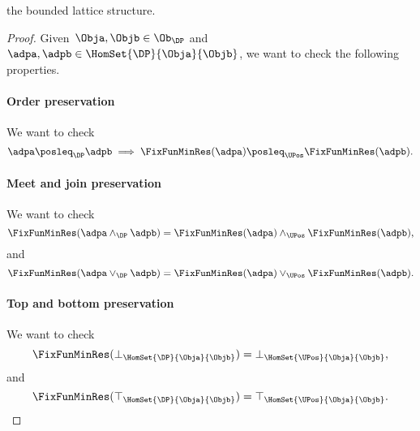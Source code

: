 
\begin{lemma}
    \FixFunMinRes the bounded lattice structure.
\end{lemma}
\begin{proof}
    Given~$\Obja,\Objb \in \Ob_\DP$ and~$\adpa,\adpb \in \HomSet{\DP}{\Obja}{\Objb}$, we want to check the following properties.
    \paragraph*{Order preservation}
    We want to check
    \begin{equation*}
        \adpa \posleq_\DP \adpb \implies \FixFunMinRes(\adpa) \posleq_\UPos \FixFunMinRes(\adpb).
    \end{equation*}
    \paragraph*{Meet and join preservation}
    We want to check
    \begin{equation*}
        \FixFunMinRes(\adpa \wedge_\DP \adpb)=\FixFunMinRes(\adpa) \wedge_\UPos \FixFunMinRes(\adpb),
    \end{equation*}
    and
    \begin{equation*}
        \FixFunMinRes(\adpa \vee_\DP \adpb)=\FixFunMinRes(\adpa) \vee_\UPos \FixFunMinRes(\adpb).
    \end{equation*}
    \paragraph*{Top and bottom preservation}
    We want to check
    \begin{equation*}
        \FixFunMinRes(\bot_{\HomSet{\DP}{\Obja}{\Objb}})=\bot_{\HomSet{\UPos}{\Obja}{\Objb}},
    \end{equation*}
    and
    \begin{equation*}
        \FixFunMinRes(\top_{\HomSet{\DP}{\Obja}{\Objb}})=\top_{\HomSet{\UPos}{\Obja}{\Objb}}.
    \end{equation*}

\end{proof}

